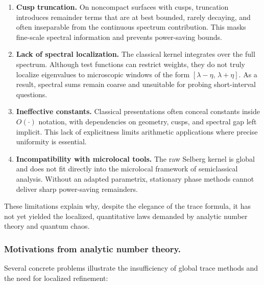\begin{enumerate}[label=\arabic*.]
  \item \textbf{Cusp truncation.} On noncompact surfaces with cusps, truncation
  introduces remainder terms that are at best bounded, rarely decaying, and
  often inseparable from the continuous spectrum contribution. This masks
  fine-scale spectral information and prevents power-saving bounds.

  \item \textbf{Lack of spectral localization.} The classical kernel integrates
  over the full spectrum. Although test functions can restrict weights, they do
  not truly localize eigenvalues to microscopic windows of the form
  $[\lambda-\eta,\,\lambda+\eta]$. As a result, spectral sums remain coarse and
  unsuitable for probing short-interval questions.

  \item \textbf{Ineffective constants.} Classical presentations often conceal
  constants inside $O(\cdot)$ notation, with dependencies on geometry, cusps,
  and spectral gap left implicit. This lack of explicitness limits arithmetic
  applications where precise uniformity is essential.

  \item \textbf{Incompatibility with microlocal tools.} The raw Selberg kernel
  is global and does not fit directly into the microlocal framework of
  semiclassical analysis. Without an adapted parametrix, stationary phase
  methods cannot deliver sharp power-saving remainders.
\end{enumerate}

These limitations explain why, despite the elegance of the trace formula, it
has not yet yielded the localized, quantitative laws demanded by analytic
number theory and quantum chaos.

\subsubsection*{Motivations from analytic number theory.}
Several concrete problems illustrate the insufficiency of global trace methods
and the need for localized refinement:

